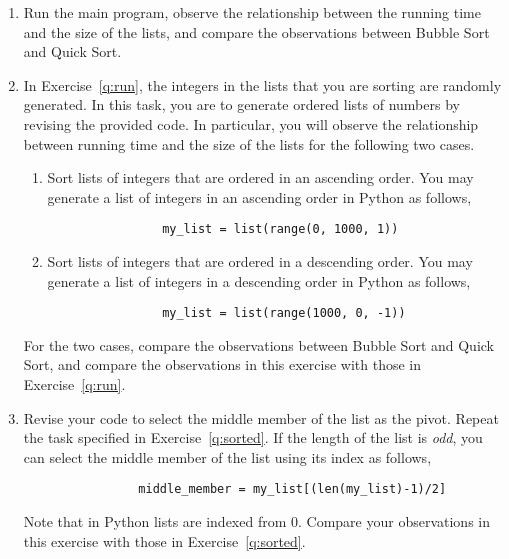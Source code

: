 \documentclass[11pt,letterpaper]{article}
\begin{document}
\begin{enumerate}
    \item \label{q:run} Run the main program, observe the relationship between
        the running time and the size of the lists, and compare the observations
        between Bubble Sort and Quick Sort. 

    \item \label{q:sorted} In Exercise~\ref{q:run}, the integers in the lists
        that you are sorting are randomly generated. In this task, you are to
        generate ordered lists of numbers by revising the provided code. In
        particular, you will observe the relationship between running time and
        the size of the lists for the following two cases. 

        \begin{enumerate}
            \item Sort lists of integers that are ordered in an ascending
                order.  You may generate a list of integers in an ascending
                order in Python as follows,

                \begin{verbatim}
                my_list = list(range(0, 1000, 1))
                \end{verbatim}

            \item Sort lists of integers that are ordered in a descending
                order.  You may generate a list of integers in a descending
                order in Python as follows,

                \begin{verbatim}
                my_list = list(range(1000, 0, -1))
                \end{verbatim}

        \end{enumerate}
        For the two cases, compare the observations between Bubble Sort and
        Quick Sort, and compare the observations in this exercise with 
        those in Exercise~\ref{q:run}.


    \item Revise your code to select the middle member of the list as the
        pivot. Repeat the task specified in Exercise~\ref{q:sorted}. If the
        length of the list is {\em odd}, you can select the middle member of
        the list using its index as follows,

                \begin{verbatim}
                middle_member = my_list[(len(my_list)-1)/2]
                \end{verbatim}

        Note that in Python lists are indexed from $0$. Compare your observations
        in this exercise with those in Exercise~\ref{q:sorted}.

\end{enumerate}
\end{document}
